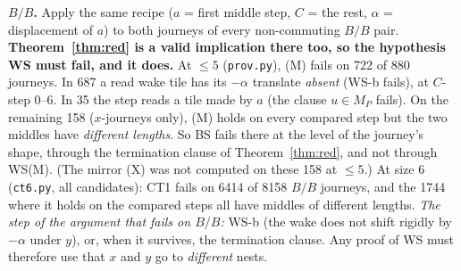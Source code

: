 \textbf{$B/B$.} Apply the same recipe ($a$ = first middle step, $C$ = the rest, $\alpha$ = displacement of $a$) to both journeys of every non-commuting $B/B$ pair. \textbf{Theorem~\ref{thm:red} is a valid implication there too, so the hypothesis WS must fail, and it does.}
At $\le5$ (\texttt{prov.py}), (M) fails on 722 of 880 journeys. In 687 a read wake tile has its $-\alpha$ translate \emph{absent} (WS-b fails), at $C$-step 0--6. In 35 the step reads a tile made by $a$ (the clause $u\in M_P$ fails).
On the remaining 158 ($x$-journeys only), (M) holds on every compared step but the two middles have \emph{different lengths}. So BS fails there at the level of the journey's shape, through the termination clause of Theorem~\ref{thm:red}, and not through WS(M). (The mirror (X) was not computed on these 158 at $\le5$.)
At size 6 (\texttt{ct6.py}, all candidates): CT1 fails on 6414 of 8158 $B/B$ journeys, and the 1744 where it holds on the compared steps all have middles of different lengths.
\emph{The step of the argument that fails on $B/B$:} WS-b (the wake does not shift rigidly by $-\alpha$ under $y$), or, when it survives, the termination clause. Any proof of WS must therefore use that $x$ and $y$ go to \emph{different} nests.

